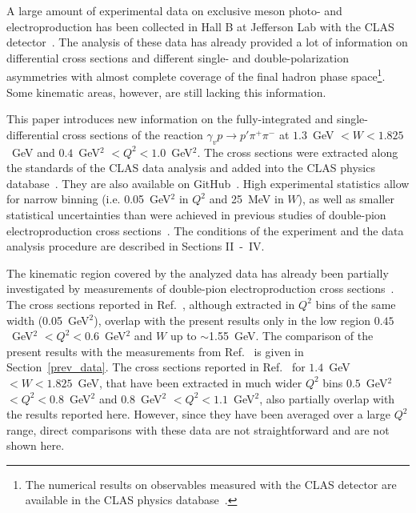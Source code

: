 \documentclass[prc,twocolumn,superscriptaddress,showpacs,amssymb,amsmath,amsfonts,aps,nofootinbib]{revtex4-1}
\begin{document}
 A large amount  of experimental data on exclusive meson photo- and electroproduction has been collected in Hall B at Jefferson Lab with the CLAS detector~\cite{Me03}.
The analysis of these data has already provided a lot of information on differential cross sections and different single- and double-polarization asymmetries with almost complete coverage of the final hadron phase space\footnote[1]{The numerical results on observables measured with the CLAS detector are available in the CLAS physics database~\cite{CLAS_DB}.}. Some kinematic areas, however, are still lacking this information. 

This paper introduces new information on the fully-integrated and single-differential cross sections of the reaction  $\gamma_{v} p \rightarrow p' \pi^{+} \pi^{-}$ at $1.3$~GeV $< W < 1.825$~GeV and $0.4$~GeV$^{2}$ $< Q^{2} < 1.0$~GeV$^{2}$. The cross sections were extracted along the standards of the CLAS data analysis and added into the CLAS physics database~\cite{CLAS_DB}. They are also available on GitHub~\cite{Github:data}. High experimental statistics allow for narrow binning (i.e. 0.05~GeV$^{2}$ in $Q^{2}$ and 25~MeV in $W$), as well as smaller statistical uncertainties than were achieved in previous studies of double-pion electroproduction cross sections~\cite{Fedotov:2008aa,Ripani:2002ss,Isupov:2017lnd}. The conditions of the experiment and the data analysis procedure are described in Sections II~-~IV.



The kinematic region covered by the analyzed data has already been partially investigated by measurements of double-pion electroproduction cross sections~\cite{Ripani:2002ss,Fedotov:2008aa}.  
The cross sections reported in Ref.~\cite{Fedotov:2008aa}, although extracted in  $Q^{2}$ bins of the same width (0.05~GeV$^{2}$),  overlap with the present results only in the low region  $0.45$~GeV$^{2}$ $< Q^{2} < 0.6$~GeV$^{2}$ and $W$ up to $\sim$1.55~GeV. The comparison of the present results with the measurements from Ref.~\cite{Fedotov:2008aa} is given in Section~\ref{prev_data}.
The cross sections reported in Ref.~\cite{Ripani:2002ss} for $1.4$~GeV $< W < 1.825$~GeV, that have been extracted in much wider $Q^{2}$ bins $0.5$~GeV$^{2}$ $< Q^{2} < 0.8$~GeV$^{2}$ and $0.8$~GeV$^{2}$ $< Q^{2} < 1.1$~GeV$^{2}$, also partially overlap with the results reported here. However, since they have been averaged over a large $Q^{2}$ range, direct comparisons with these data are not straightforward and are not shown here.  
\end{document}
